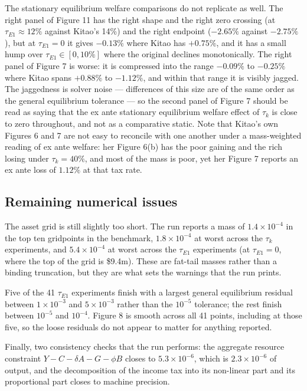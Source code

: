 \documentclass[11pt,fleqn]{article}
\begin{document}
The stationary equilibrium welfare comparisons do not replicate as well. The right panel of Figure 11 has the right shape and the right zero crossing (at $\tau_{E1}\approx 12\%$ against Kitao's 14\%) and the right endpoint ($-2.65\%$ against $-2.75\%$), but at $\tau_{E1}=0$ it gives $-0.13\%$ where Kitao has $+0.75\%$, and it has a small hump over $\tau_{E1}\in[0,10\%]$ where the original declines monotonically. The right panel of Figure 7 is worse: it is compressed into the range $-0.09\%$ to $-0.25\%$ where Kitao spans $+0.88\%$ to $-1.12\%$, and within that range it is visibly jagged. The jaggedness is solver noise --- differences of this size are of the same order as the general equilibrium tolerance --- so the second panel of Figure 7 should be read as saying that the ex ante stationary equilibrium welfare effect of $\tau_k$ is close to zero throughout, and not as a comparative static. Note that Kitao's own Figures 6 and 7 are not easy to reconcile with one another under a mass-weighted reading of ex ante welfare: her Figure 6(b) has the poor gaining and the rich losing under $\tau_k=40\%$, and most of the mass is poor, yet her Figure 7 reports an ex ante loss of $1.12\%$ at that tax rate.

\subsection*{Remaining numerical issues}
The asset grid is still slightly too short. The run reports a mass of $1.4\times10^{-4}$ in the top ten gridpoints in the benchmark, $1.8\times10^{-4}$ at worst across the $\tau_k$ experiments, and $5.4\times10^{-4}$ at worst across the $\tau_{E1}$ experiments (at $\tau_{E1}=0$, where the top of the grid is \$9.4m). These are fat-tail masses rather than a binding truncation, but they are what sets the warnings that the run prints.

Five of the 41 $\tau_{E1}$ experiments finish with a largest general equilibrium residual between $1\times10^{-3}$ and $5\times10^{-3}$ rather than the $10^{-5}$ tolerance; the rest finish between $10^{-5}$ and $10^{-4}$. Figure 8 is smooth across all 41 points, including at those five, so the loose residuals do not appear to matter for anything reported.

Finally, two consistency checks that the run performs: the aggregate resource constraint $Y-C-\delta A-G-\phi B$ closes to $5.3\times10^{-6}$, which is $2.3\times10^{-6}$ of output, and the decomposition of the income tax into its non-linear part and its proportional part closes to machine precision.
\end{document}
